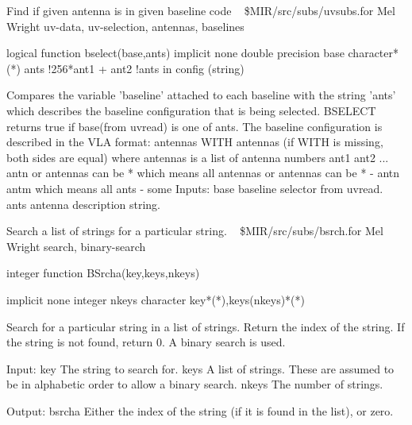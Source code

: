 %
\noindent Find if given antenna is in given baseline code
\newline \ 
\newline {} \$MIR/src/subs/uvsubs.for
\newline {} Mel Wright
\newline {} uv-data, uv-selection, antennas, baselines
\par{\tenpoint
{\eightpoint\begintt
        logical function bselect(base,ants)
        implicit none
        double precision base
        character*(*) ants
                                       !256*ant1 + ant2
                                       !ants in config (string)

  Compares the variable 'baseline' attached to each baseline with
  the string 'ants' which describes the baseline configuration
  that is being selected.  BSELECT returns true if base(from uvread)
  is one of ants. The baseline configuration is described in the
  VLA format:
     antennas  WITH  antennas  (if WITH is missing, both sides are equal)
      where antennas is a list of antenna numbers  ant1 ant2 ...  antn
      or    antennas can be  *   which means all antennas
      or    antennas can be  * - antn antm  which means all ants - some
  Inputs:
    base       baseline selector from uvread.
    ants       antenna description string.
\endtt}
\par}
%
\noindent Search a list of strings for a particular string.
\newline \ 
\newline {} \$MIR/src/subs/bsrch.for
\newline {} Mel Wright
\newline \abox{Keywords:} search, binary-search
\par{\tenpoint
{\eightpoint\begintt
        integer function BSrcha(key,keys,nkeys)

        implicit none
        integer nkeys
        character key*(*),keys(nkeys)*(*)

  Search for a particular string in a list of strings. Return the
  index of the string. If the string is not found, return 0.
  A binary search is used.

  Input:
    key        The string to search for.
    keys       A list of strings. These are assumed to be in alphabetic
               order to allow a binary search.
    nkeys      The number of strings.

  Output:
    bsrcha     Either the index of the string (if it is found in the
               list), or zero.
\endtt}
\par}
